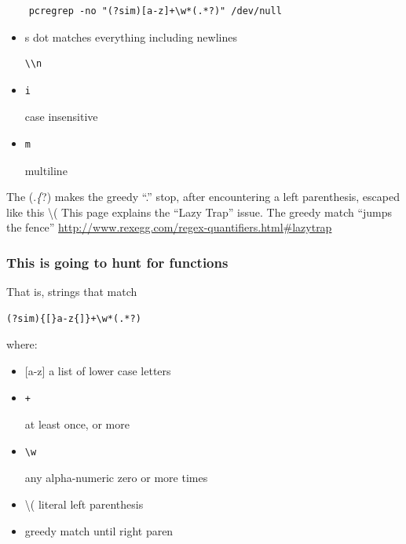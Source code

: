 \documentclass{article}
\begin{document}
\begin{Verbatim}
    pcregrep -no "(?sim)[a-z]+\w*(.*?)" /dev/null
\end{Verbatim}

\begin{itemize}
\itemsep1pt\parskip0pt
\item
    s dot matches everything including newlines\begin{verbatim}\\n\end{verbatim}
\item
    \begin{verbatim}i\end{verbatim} case insensitive
\item
 \begin{verbatim}m\end{verbatim}  multiline
\end{itemize}

The (.\emph\{?) makes the greedy ``.'' stop, after encountering a left
    parenthesis, escaped like this \textbackslash{}( This page explains the
    ``Lazy Trap'' issue. The greedy match ``jumps the fence''
    \url{http://www.rexegg.com/regex-quantifiers.html\#lazytrap}

\subsubsection{This is going to hunt for
functions}\label{this-is-going-to-hunt-for-functions}

That is, strings that match\begin{verbatim}(?sim){[}a-z{]}+\w*(.*?)\end{verbatim} where:

\begin{itemize}
\itemsep1pt\parskip0pt
\item
  {[}a-z{]} a list of lower case letters
\item
    \begin{verbatim}+\end{verbatim} at least once, or more
\item
  \begin{verbatim}\w\end{verbatim} any alpha-numeric zero or more times
\item
  \textbackslash{}( literal left parenthesis
\item
  greedy match until right paren
\end{itemize}
\end{document}

